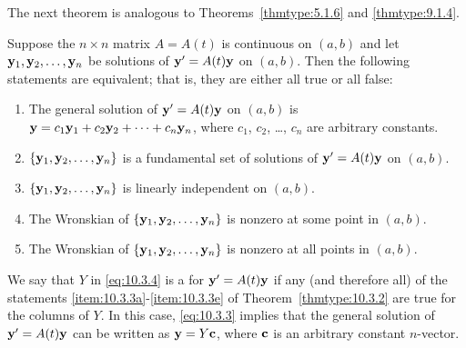 \documentclass{ximera}
\begin{document}
The next theorem is analogous to
Theorems~\ref{thmtype:5.1.6} and
\ref{thmtype:9.1.4}.

\begin{theorem}\label{thmtype:10.3.3}
Suppose the  $n\times n$ matrix $A=A(t)$ is continuous
 on $(a,b)$ and let
${\bf y}_1, {\bf y}_2, \dots,{\bf y}_n$
be  solutions of ${\bf y}'=A(t){\bf y}$ on  $(a,b)$.
 Then the following statements are equivalent; that is, they are
either all true or all false:
\begin{enumerate}
\item\label{item:10.3.3a} %
The general solution of ${\bf y}'=A(t){\bf y}$ on  $(a,b)$ is
${\bf y}=c_1{\bf y}_1+c_2{\bf y}_2+\cdots+c_n{\bf y}_n$,
where $c_1$, $c_2$, \dots, $c_n$  are arbitrary constants.
\item\label{item:10.3.3b} %
  $\{{\bf y}_1,{\bf y}_2,\dots,{\bf y}_n\}$ is a fundamental
set of solutions of ${\bf y}'=A(t){\bf y}$  on $(a,b)$.
\item\label{item:10.3.3c} %
 $\{{\bf y}_1,{\bf y}_2,\dots,{\bf y}_n\}$ is linearly
independent on $(a,b)$.
\item\label{item:10.3.3d} %
The Wronskian of  $\{{\bf y}_1,{\bf y}_2,\dots,{\bf y}_n\}$ is nonzero
at some point in $(a,b)$.
\item\label{item:10.3.3e} %
The Wronskian of  $\{{\bf y}_1,{\bf y}_2,\dots,{\bf y}_n\}$ is nonzero
at all points in $(a,b)$.
\end{enumerate}
\end{theorem}


We say that $Y$ in \eqref{eq:10.3.4} is a  for
${\bf y}'=A(t){\bf y}$ if any (and therefore all) of the statements
\ref{item:10.3.3a}-\ref{item:10.3.3e} of Theorem~\ref{thmtype:10.3.2} are true for the
columns of $Y$. In this case, \eqref{eq:10.3.3} implies that the general
solution of ${\bf y}'=A(t){\bf y}$ can be written as ${\bf y}=Y{\bf
c}$, where ${\bf c}$ is an arbitrary constant $n$-vector.
\end{document}
